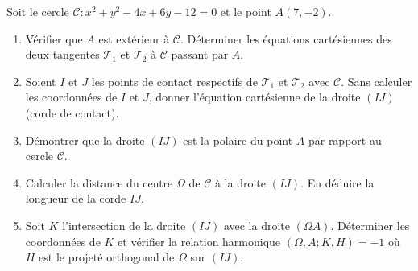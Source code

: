 \documentclass[11pt]{article}
\begin{document}
\begin{exercice}
Soit le cercle $\mathcal{C} : x^2 + y^2 - 4x + 6y - 12 = 0$ et le point $A(7, -2)$.
\begin{enumerate}
    \item Vérifier que $A$ est extérieur à $\mathcal{C}$. Déterminer les équations cartésiennes des deux tangentes $\mathcal{T}_1$ et $\mathcal{T}_2$ à $\mathcal{C}$ passant par $A$.
    \item Soient $I$ et $J$ les points de contact respectifs de $\mathcal{T}_1$ et $\mathcal{T}_2$ avec $\mathcal{C}$. Sans calculer les coordonnées de $I$ et $J$, donner l'équation cartésienne de la droite $(IJ)$ (corde de contact).
    \item Démontrer que la droite $(IJ)$ est la polaire du point $A$ par rapport au cercle $\mathcal{C}$.
    \item Calculer la distance du centre $\Omega$ de $\mathcal{C}$ à la droite $(IJ)$. En déduire la longueur de la corde $IJ$.
    \item Soit $K$ l'intersection de la droite $(IJ)$ avec la droite $(\Omega A)$. Déterminer les coordonnées de $K$ et vérifier la relation harmonique $(\Omega, A; K, H) = -1$ où $H$ est le projeté orthogonal de $\Omega$ sur $(IJ)$.
\end{enumerate}
\end{exercice}
\end{document}
